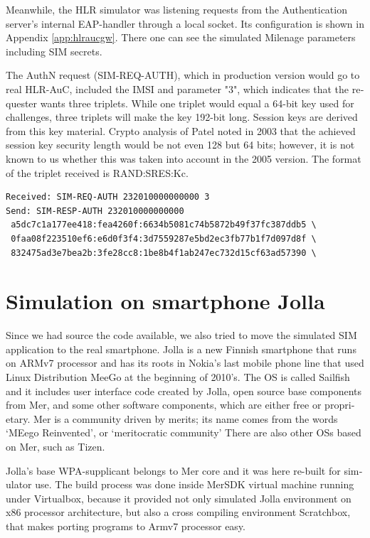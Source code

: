 \documentclass[12pt,a4paper,english]{tutthesis}
\begin{document}
\begin{otherlanguage}{english}
Meanwhile, the HLR simulator was listening requests from the Authentication
server's internal EAP-handler through a local socket. 
Its configuration is shown in
Appendix \ref{app:hlraucgw}. There one can see the simulated Milenage parameters including SIM secrets.



The AuthN request (SIM-REQ-AUTH), which in production version would go
to real HLR-AuC, included the IMSI and parameter "3", which indicates
that the requester wants three triplets.  
While one triplet would equal a 64-bit key used for challenges, three
triplets will make the key 192-bit long. Session keys are derived from
this key material. Crypto analysis of Patel \cite{patel-sim} noted in
2003 that the achieved session key security length would be not  even 128
but 64 bits; however,  it is not known to us whether this was taken into
account in the 2005 version. The 
format of the triplet received is RAND:SRES:Kc.

\footnotesize
\begin{verbatim}
Received: SIM-REQ-AUTH 232010000000000 3
Send: SIM-RESP-AUTH 232010000000000 
 a5dc7c1a177ee418:fea4260f:6634b5081c74b5872b49f37fc387ddb5 \
 0faa08f223510ef6:e6d0f3f4:3d7559287e5bd2ec3fb77b1f7d097d8f \
 832475ad3e7bea2b:3fe28cc8:1be8b4f1ab247ec732d15cf63ad57390 \
\end{verbatim}
\normalsize


\section{Simulation on smartphone Jolla}
\label{sec-5-3}

Since we had source the code available, we also tried to move the
simulated SIM application to the real smartphone.  Jolla is a new
Finnish smartphone that runs on ARMv7 processor and has its roots in
Nokia's last mobile phone line that used Linux Distribution MeeGo at
the beginning of 2010's.  The OS is called Sailfish and it includes user
interface code created by Jolla, open source base components from Mer, and
some other software components, which are either free or proprietary.
Mer is a community driven by merits; its name comes from the words 
`MEego Reinvented', or `meritocratic community'
There are also other OSs based on Mer, such as Tizen.

Jolla's base
WPA-supplicant belongs to Mer core and it was here re-built for
simulator use. The build process was done inside MerSDK virtual
machine running under Virtualbox, because it provided not only
simulated Jolla environment on x86 processor architecture, but also a cross
compiling environment Scratchbox, that makes porting programs to Armv7
processor easy.


\end{otherlanguage}
\end{document}
